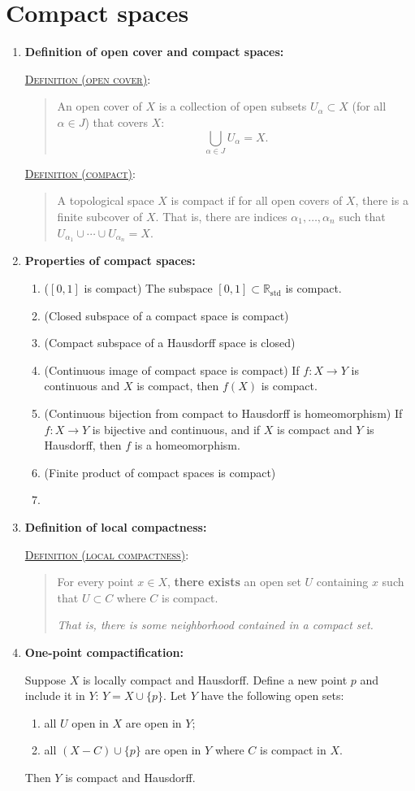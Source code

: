 \documentclass[letterpaper, 12pt]{book}
\newcommand{\RR}{\mathbb{R}}
\newcommand{\defn}[2]{\textsc{\underline{Definition (#1)}:}\begin{quote} #2\end{quote}}
\begin{document}
\section{Compact spaces}
    \begin{enumerate}[resume]
    \item \textbf{Definition of open cover and compact spaces:}

        \defn{open cover}{An open cover of $X$ is a collection of open subsets $U_\alpha\subset X$ (for all $\alpha\in J$) that covers $X$: \[\bigcup_{\alpha\in J} U_\alpha = X.\]}

        \defn{compact}{A topological space $X$ is compact if for all open covers of $X$, there is a finite subcover of $X$. That is, there are indices $\alpha_1, \dots, \alpha_n$ such that $U_{\alpha_1}\cup\cdots\cup U_{\alpha_n} = X$.}
    \item \textbf{Properties of compact spaces:}
        \begin{enumerate}
            \item ($[0,1]$ is compact) The subspace $[0,1]\subset \RR_\text{std}$ is compact.
            \item (Closed subspace of a compact space is compact)
            \item (Compact subspace of a Hausdorff space is closed)
            \item (Continuous image of compact space is compact) If $f:X\to Y$ is continuous and $X$ is compact, then $f(X)$ is compact.
            \item (Continuous bijection from compact to Hausdorff is homeomorphism) If $f:X\to Y$ is bijective and continuous, and if $X$ is compact and $Y$ is Hausdorff, then $f$ is a homeomorphism.
            \item (Finite product of compact spaces is compact)
            \item 
        \end{enumerate}
    \item \textbf{Definition of local compactness:}

        \defn{local compactness}{For every point $x\in X$, \textbf{there exists} an open set $U$ containing $x$ such that $U\subset C$ where $C$ is compact.

        \textit{That is, there is some neighborhood contained in a compact set.}}
    \item \textbf{One-point compactification:}

        Suppose $X$ is locally compact and Hausdorff. Define a new point $p$ and include it in $Y$: $Y = X\cup \{p\}$. Let $Y$ have the following open sets:
        \begin{enumerate}
        \item all $U$ open in $X$ are open in $Y$;
        \item all $(X-C)\cup\{p\}$ are open in $Y$ where $C$ is compact in $X$.
        \end{enumerate}
        Then $Y$ is compact and Hausdorff.
    \end{enumerate}
\end{document}
